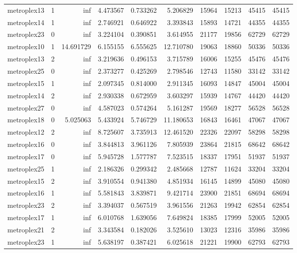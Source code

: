 \begin{longtable}{|l|r|r|r|r|r|r|r|r|r|}
metroplex13 & 1 & inf & 4.473567 & 0.733262 & 5.206829 & 15964 & 15213 & 45415 & 45415 \\
metroplex14 & 1 & inf & 2.746921 & 0.646922 & 3.393843 & 15893 & 14721 & 44355 & 44355 \\
metroplex23 & 0 & inf & 3.224104 & 0.390851 & 3.614955 & 21177 & 19856 & 62729 & 62729 \\
metroplex10 & 1 & 14.691729 & 6.155155 & 6.555625 & 12.710780 & 19063 & 18860 & 50336 & 50336 \\
metroplex13 & 2 & inf & 3.219636 & 0.496153 & 3.715789 & 16006 & 15255 & 45476 & 45476 \\
metroplex25 & 0 & inf & 2.373277 & 0.425269 & 2.798546 & 12743 & 11580 & 33142 & 33142 \\
metroplex15 & 1 & inf & 2.097345 & 0.814000 & 2.911345 & 16093 & 14847 & 45004 & 45004 \\
metroplex14 & 2 & inf & 2.930338 & 0.672959 & 3.603297 & 15939 & 14767 & 44420 & 44420 \\
metroplex27 & 0 & inf & 4.587023 & 0.574264 & 5.161287 & 19569 & 18277 & 56528 & 56528 \\
metroplex18 & 0 & 5.025063 & 5.433924 & 5.746729 & 11.180653 & 16843 & 16461 & 47067 & 47067 \\
metroplex12 & 2 & inf & 8.725607 & 3.735913 & 12.461520 & 22326 & 22097 & 58298 & 58298 \\
metroplex16 & 0 & inf & 3.844813 & 3.961126 & 7.805939 & 23864 & 21815 & 68642 & 68642 \\
metroplex17 & 0 & inf & 5.945728 & 1.577787 & 7.523515 & 18337 & 17951 & 51937 & 51937 \\
metroplex25 & 1 & inf & 2.186326 & 0.299342 & 2.485668 & 12787 & 11624 & 33204 & 33204 \\
metroplex15 & 2 & inf & 3.910554 & 0.941380 & 4.851934 & 16145 & 14899 & 45080 & 45080 \\
metroplex16 & 1 & inf & 5.581843 & 3.839871 & 9.421714 & 23900 & 21851 & 68694 & 68694 \\
metroplex23 & 2 & inf & 3.394037 & 0.567519 & 3.961556 & 21263 & 19942 & 62854 & 62854 \\
metroplex17 & 1 & inf & 6.010768 & 1.639056 & 7.649824 & 18385 & 17999 & 52005 & 52005 \\
metroplex21 & 2 & inf & 3.343584 & 0.182026 & 3.525610 & 13023 & 12316 & 35986 & 35986 \\
metroplex23 & 1 & inf & 5.638197 & 0.387421 & 6.025618 & 21221 & 19900 & 62793 & 62793 \\

\end{longtable}
